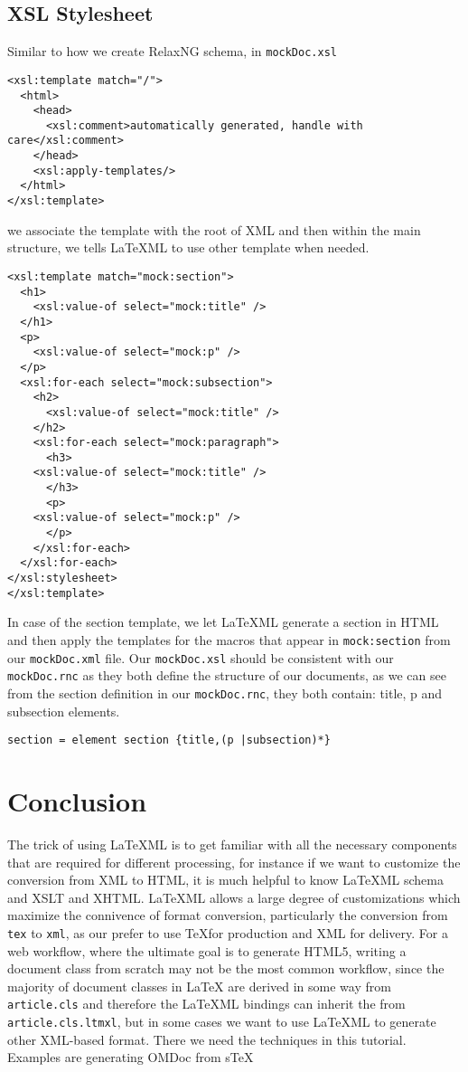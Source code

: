 \documentclass[a4paper]{article}
\def\latexml{{\LaTeX}ML\xspace}
\begin{document}
\subsection{XSL Stylesheet}
Similar to how we create RelaxNG schema, in \lstinline|mockDoc.xsl|
\begin{lstlisting}
<xsl:template match="/">
  <html>
    <head>
      <xsl:comment>automatically generated, handle with care</xsl:comment>
    </head>
    <xsl:apply-templates/>
  </html>
</xsl:template>
\end{lstlisting}
we associate the template with the root of XML and then within the main structure, we tells \latexml to use other
template when needed.
\begin{lstlisting}
<xsl:template match="mock:section">
  <h1>
    <xsl:value-of select="mock:title" />
  </h1>
  <p>
    <xsl:value-of select="mock:p" />
  </p>
  <xsl:for-each select="mock:subsection">
    <h2>
      <xsl:value-of select="mock:title" />
    </h2>
    <xsl:for-each select="mock:paragraph">
      <h3>
	<xsl:value-of select="mock:title" />
      </h3>
      <p>
	<xsl:value-of select="mock:p" />
      </p>
    </xsl:for-each>
  </xsl:for-each>
</xsl:stylesheet>
</xsl:template>
\end{lstlisting}
In case of the section template, we let \latexml generate a section in HTML and then apply the templates for the macros that appear in \lstinline|mock:section| from our \lstinline|mockDoc.xml| file. Our \lstinline|mockDoc.xsl| should be consistent with our \lstinline|mockDoc.rnc| as they both define the structure of our documents, as we can see from the section definition in our \lstinline|mockDoc.rnc|, they both contain: title, p and subsection elements.
\begin{lstlisting}
section = element section {title,(p |subsection)*}
\end{lstlisting}

\section{Conclusion}\label{sec:concl}
The trick of using \latexml is to get familiar with all the necessary components that are required for different processing, for instance if we want to customize the conversion from XML to HTML, it is much helpful to know 
  \latexml schema and XSLT and XHTML. \latexml allows a large degree of customizations which maximize the connivence of format conversion, particularly the conversion from \lstinline|tex| to \lstinline|xml|, as our prefer to use  \TeX for production and XML for delivery. For a web workflow, where the ultimate goal is to generate HTML5, writing a document class from scratch may not be the most common workflow, since the majority of document classes in {\LaTeX} are derived in some way from \lstinline|article.cls| and therefore
  the \latexml bindings can inherit the from \lstinline|article.cls.ltmxl|, but in some
  cases we want to use \latexml to generate other XML-based format. There we need the
  techniques in this tutorial. Examples are generating OMDoc from s\TeX{}
\end{document}

